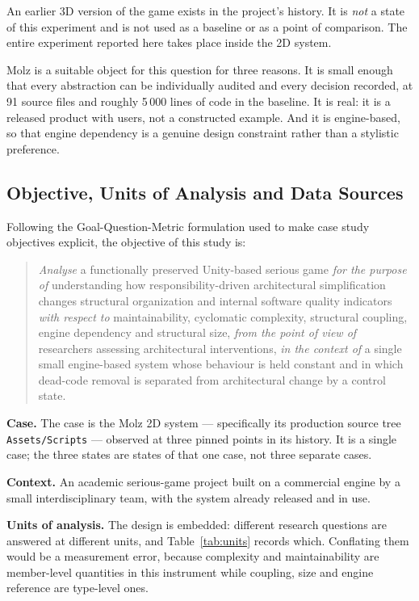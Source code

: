 \documentclass{sbc2019}%
\begin{document}
An earlier 3D version of the game exists in the project's history. It is
\emph{not} a state of this experiment and is not used as a baseline or as a
point of comparison. The entire experiment reported here takes place inside the
2D system.

Molz is a suitable object for this question for three reasons. It is small
enough that every abstraction can be individually audited and every decision
recorded, at 91 source files and roughly 5\,000 lines of code in the baseline.
It is real: it is a released product with users, not a constructed example. And
it is engine-based, so that engine dependency is a genuine design constraint
rather than a stylistic preference.

\subsection{Objective, Units of Analysis and Data Sources}

Following the Goal-Question-Metric formulation used to make case study objectives
explicit, the objective of this study is:

\begin{quote}
\emph{Analyse} a functionally preserved Unity-based serious game \emph{for the
purpose of} understanding how responsibility-driven architectural simplification
changes structural organization and internal software quality indicators
\emph{with respect to} maintainability, cyclomatic complexity, structural
coupling, engine dependency and structural size, \emph{from the point of view of}
researchers assessing architectural interventions, \emph{in the context of} a
single small engine-based system whose behaviour is held constant and in which
dead-code removal is separated from architectural change by a control state.
\end{quote}

\textbf{Case.} The case is the Molz 2D system --- specifically its production
source tree \texttt{Assets/Scripts} --- observed at three pinned points in its
history. It is a single case; the three states are states of that one case, not
three separate cases.

\textbf{Context.} An academic serious-game project built on a commercial engine
by a small interdisciplinary team, with the system already released and in use.

\textbf{Units of analysis.} The design is embedded: different research questions
are answered at different units, and Table~\ref{tab:units} records which.
Conflating them would be a measurement error, because complexity and
maintainability are member-level quantities in this instrument while coupling,
size and engine reference are type-level ones.
\end{document}
